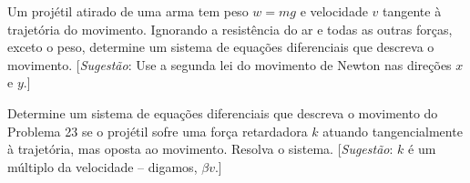\documentclass[oneside,12pt,a4paper]{report}
\begin{document}
\begin{itensquestao} 
    \item Um projétil atirado de uma arma tem peso $w = mg$ e velocidade $v$ tangente à trajetória do movimento. Ignorando a resistência do ar e todas as outras forças, exceto o peso, determine um sistema de equações diferenciais que descreva o movimento. [\textit{Sugestão}: Use a segunda lei do movimento de Newton nas direções $x$ e $y$.]
    \item Determine um sistema de equações diferenciais que descreva o movimento do Problema 23 se o projétil sofre uma força retardadora $k$ atuando tangencialmente à trajetória, mas oposta ao movimento. Resolva o sistema. [\textit{Sugestão}: $k$ é um múltiplo da velocidade -- digamos, $\beta v$.]
\end{itensquestao}
\end{document}
